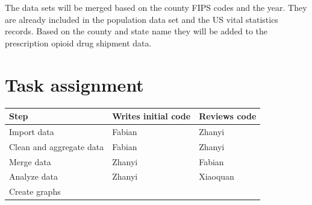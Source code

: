 \documentclass[12pt]{article}
\begin{document}
The data sets will be merged based on the county FIPS codes and the year. They are already included in the population data set and the US vital statistics records. Based on the county and state name they will be added to the prescription opioid drug shipment data.
\vspace*{1cm}


\section{Task assignment}

\begin{center}
\begin{tabular}{ l | l l}
\textbf{Step}  & \textbf{Writes initial code} & \textbf{Reviews code}\\ \hline
 Import data & Fabian & Zhanyi\\  
 Clean and aggregate data & Fabian & Zhanyi\\
 Merge data & Zhanyi & Fabian \\
 Analyze data & Zhanyi & Xiaoquan \\
 Create graphs & & \\
\end{tabular}
\end{center}
\end{document}

